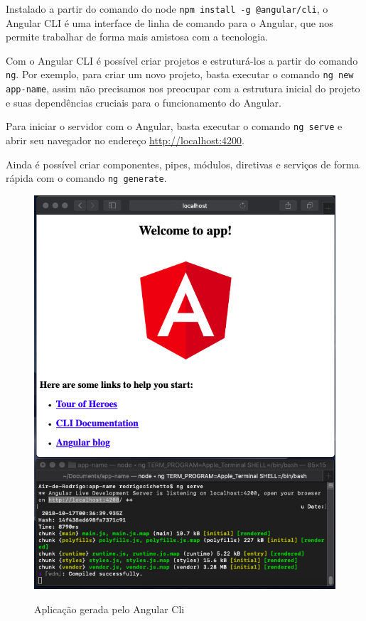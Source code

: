 \documentclass[
	12pt,				%
	openright,			%
	twoside,			%
	a4paper,			%
	english,			%
	brazil				%
	]{abntex2}
\begin{document}
\begin{anexosenv}
Instalado a partir do comando do node \verb|npm install -g @angular/cli|, o Angular CLI é uma interface de linha de comando para o Angular, que nos permite trabalhar de forma mais amistosa com a tecnologia.

Com o Angular CLI é possível criar projetos e estruturá-los a partir do comando \verb|ng|. Por exemplo, para criar um novo projeto, basta executar o comando \verb|ng new app-name|, assim não precisamos nos preocupar com a estrutura inicial do projeto e suas dependências cruciais para o funcionamento do Angular. 

Para iniciar o servidor com o Angular, basta executar o comando \verb|ng serve| e abrir seu navegador no endereço \href{http://localhost:4200}{http://localhost:4200}.

Ainda é possível criar componentes, pipes, módulos, diretivas e serviços de forma rápida com o comando \verb|ng generate|.

\begin{figure}[h]
	\centering

	\caption{Aplicação gerada pelo Angular Cli} \label{fig:AngularCliApp}
    \includegraphics[scale=0.4]{angular-cli-app} \\


\end{figure}
\end{anexosenv}
\end{document}
